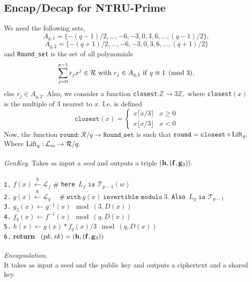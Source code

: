 \documentclass{amsart}
\numberwithin{equation}{section}
\begin{document}
{ \subsection{Encap/Decap for NTRU-Prime} We need the following sets,
 $$A_{q,1}=\{-(q-1)/2,...,-6,-3,0,3,6,...,(q-1)/2\},$$ 
 $$A_{q,2}=\{-(q+1)/2,...,-6,-3,0,3,6,...,(q+1)/2\}$$ and
  {\texttt{Round\_set}} is the set of all polynomials 
 $$\sum_{j=0}^{p-1} r_jx^j\in {\mathcal{R}}\ {\rm{with}}\ r_j\in A_{q,1}\ {\rm{if}}\ q\equiv 1 \pmod{3},$$ else $r_j\in A_{q,2}.$
 Also, we consider a function {\texttt{closest}}:${\mathbb{Z}}\rightarrow 3{\mathbb{Z}},$ where {\texttt{closest}}$(x)$ is the  multiple of $3$ nearest to $x.$ I.e. is defined  
\[ {\texttt{closest}}(x) = \begin{cases} 
      x\lceil x/3 \rceil & x\geq 0 \\
      x\lfloor x/3 \rfloor & x <0 
   \end{cases}
\] 
 Now, the function ${\texttt{round}}:{\mathcal{R}}/q\rightarrow {\texttt{Round\_set}}$ is such that ${\texttt{round}} = {\texttt{closest}}\circ {\rm{Lift}}_q.$
Where ${\rm{Lift}}_q:{\mathcal{L}}_m\rightarrow {\mathcal{R}}/q.$
\ \\\\
{\it GenKey}. 
Takes as input a {\it{seed}} and outputs a triple $({\bf h},({\bf f},{\bf g}_3)).$\\\\
\texttt{1.}  $f(x)\xleftarrow{\$} {\mathcal{L}}_f $  \hspace{10pt} \# {\texttt{here}}\ $L_f \texttt{ is } {\mathcal{T}}_{p-1}(w)$\\
\texttt{2.}  $g(x)\xleftarrow{\$} {\mathcal{L}}_g\hspace{10pt}\ \ \# \ {\texttt{with}}\ g(x)\  \texttt{invertible modulo}\ 3.$  {\texttt{Also}}\ $L_g \texttt{ is } {\mathcal{T}}_{p-1}$\\
\texttt{3.}  $g_3(x)\leftarrow g^{-1}(x)\mod{(3,D(x))}$\\
\texttt{4.} $f_q(x)\leftarrow f^{-1}(x)\mod{(q,D(x))}$\\
\texttt{5.}  $h(x) \leftarrow g(x)*f_q(x)/3\mod{(q,D(x))}$\\ 
\texttt{6.} {\bf return} \ $(pk,sk)=({\bf h},({\bf f},{\bf g}_3))$\ \\\\
{\it Encapsulation}.
\ \\
It takes as input a seed and the public key and outputs a ciphertext and a shared key.\\\\
}
\end{document}
